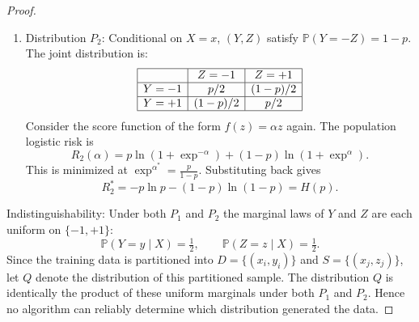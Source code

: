 \begin{proof}
\begin{enumerate}
         \item[(II)] Distribution $P_2$:
         Conditional on $X=x$, $(Y,Z)$ satisfy $\mathbb{P}(Y = -Z) = 1-p$. The joint distribution is:
         \begin{equation*}
             \begin{array}{|c|c|c|}
                 \hline
                 & Z=-1 & Z=+1 \\
                 \hline
                 Y=-1 & p/2 & (1-p)/2 \\
                 \hline
                 Y=+1 & (1-p)/2 & p/2 \\
                 \hline
             \end{array}
         \end{equation*}
         Consider the score function of the form $f(z) = \alpha z$ again. The population logistic risk is
         \begin{equation*}
             R_2(\alpha) = p\ln(1+\exp^{-\alpha}) + (1-p)\ln(1+\exp^{\alpha}).
         \end{equation*}
         This is minimized at $\exp^{\alpha^*} = \frac{p}{1-p}$. Substituting back gives
         \begin{equation*}
             R_2^* = -p\ln p - (1-p)\ln(1-p) = H(p).
         \end{equation*}
    \end{enumerate}

    \noindent Indistinguishability: Under both $P_1$ and $P_2$ the marginal laws of $Y$ and $Z$ are each uniform on $\{-1,+1\}$:
     \begin{equation*}
         \mathbb{P}(Y=y \mid X) = \tfrac{1}{2}, \qquad \mathbb{P}(Z=z \mid X) = \tfrac{1}{2}.
     \end{equation*}
     Since the training data is partitioned into $D = \{(x_i, y_i)\}$ and $S = \{(x_j, z_j)\}$, let $Q$ denote the distribution of this partitioned sample. The distribution $Q$ is identically the product of these uniform marginals under both $P_1$ and $P_2$. Hence no algorithm can reliably determine which distribution generated the data.


\end{proof}
